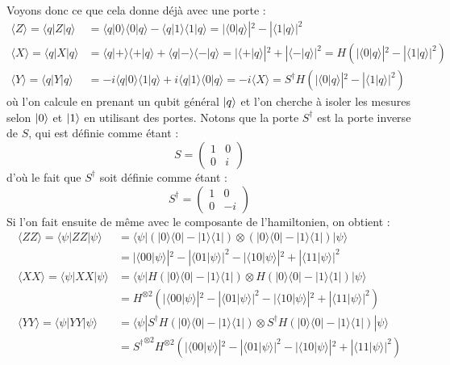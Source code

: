 Voyons donc ce que cela donne déjà avec une porte :
\begin{align*}
    \langle Z \rangle = \langle q| Z |q \rangle &= \langle q|0 \rangle \langle 0|q\rangle - \langle q|1 \rangle \langle 1|q\rangle = |\langle 0|q \rangle|^2-|\langle 1|q \rangle|^2 \\
    \langle X \rangle = \langle q| X |q \rangle &= \langle q|+ \rangle \langle +|q\rangle + \langle q|- \rangle \langle -|q\rangle = |\langle +|q \rangle|^2 + |\langle -|q \rangle|^2 = H (|\langle 0|q \rangle|^2-|\langle 1|q \rangle|^2) \\
    \langle Y \rangle = \langle q| Y |q \rangle &= -i \langle q|0 \rangle \langle 1|q\rangle + i \langle q|1 \rangle \langle 0|q\rangle = -i \langle X \rangle = S^\dag H (|\langle 0|q \rangle|^2-|\langle 1|q \rangle|^2)
\end{align*}
où l'on calcule en prenant un qubit général $\ket{q}$ et l'on cherche à isoler les mesures selon
$\ket{0}$ et $\ket{1}$ en utilisant des portes.
Notons que la porte $S^\dag$ est la porte inverse de $S$, qui est définie comme étant :
\[
    S = \begin{pmatrix}
        1 & 0 \\
        0 & i
    \end{pmatrix}
\]
d'où le fait que $S^\dag$ soit définie comme étant :
\[
    S^\dag = \begin{pmatrix}
        1 & 0 \\
        0 & -i
    \end{pmatrix}
\]
Si l'on fait ensuite de même avec le composante de l'hamiltonien, on obtient :
\begin{align*}
    \langle ZZ \rangle = \langle \psi| ZZ |\psi \rangle &= \langle \psi|(|0 \rangle \langle 0| - |1 \rangle \langle 1|) \otimes (|0 \rangle \langle 0| - |1 \rangle \langle 1|)|\psi \rangle \\
    &= |\langle 00|\psi \rangle|^2-|\langle 01|\psi \rangle|^2-|\langle 10|\psi \rangle|^2+|\langle 11|\psi \rangle|^2 \\
    \langle XX \rangle = \langle \psi| XX |\psi \rangle &= \langle \psi|H(|0 \rangle \langle 0| - |1 \rangle \langle 1|) \otimes H(|0 \rangle \langle 0| - |1 \rangle \langle 1|)|\psi \rangle \\
    &= H^{\otimes 2}(|\langle 00|\psi \rangle|^2-|\langle 01|\psi \rangle|^2-|\langle 10|\psi \rangle|^2+|\langle 11|\psi \rangle|^2) \\
    \langle YY \rangle = \langle \psi| YY |\psi \rangle &= \langle \psi|S^\dag H(|0 \rangle \langle 0| - |1 \rangle \langle 1|) \otimes S^\dag H(|0 \rangle \langle 0| - |1 \rangle \langle 1|)|\psi \rangle \\
    &= {S^{\dag}}^{\otimes 2} H^{\otimes 2}(|\langle 00|\psi \rangle|^2-|\langle 01|\psi \rangle|^2-|\langle 10|\psi \rangle|^2+|\langle 11|\psi \rangle|^2)
\end{align*}
